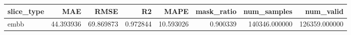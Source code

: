 \begin{tabular}{lrrrrrrr}
\toprule
slice_type & MAE & RMSE & R2 & MAPE & mask_ratio & num_samples & num_valid \\
\midrule
embb & 44.393936 & 69.869873 & 0.972844 & 10.593026 & 0.900339 & 140346.000000 & 126359.000000 \\
\bottomrule
\end{tabular}
